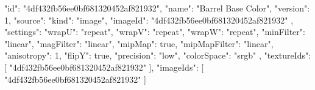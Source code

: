 {
  "id": "4df432fb56ee0bf681320452af821932",
  "name": "Barrel Base Color",
  "version": 1,
  "source": {
    "kind": "image",
    "imageId": "4df432fb56ee0bf681320452af821932"
  },
  "settings": {
    "wrapU": "repeat",
    "wrapV": "repeat",
    "wrapW": "repeat",
    "minFilter": "linear",
    "magFilter": "linear",
    "mipMap": true,
    "mipMapFilter": "linear",
    "anisotropy": 1,
    "flipY": true,
    "precision": "low",
    "colorSpace": "srgb"
  },
  "textureIds": [
    "4df432fb56ee0bf681320452af821932"
  ],
  "imageIds": [
    "4df432fb56ee0bf681320452af821932"
  ]
}
